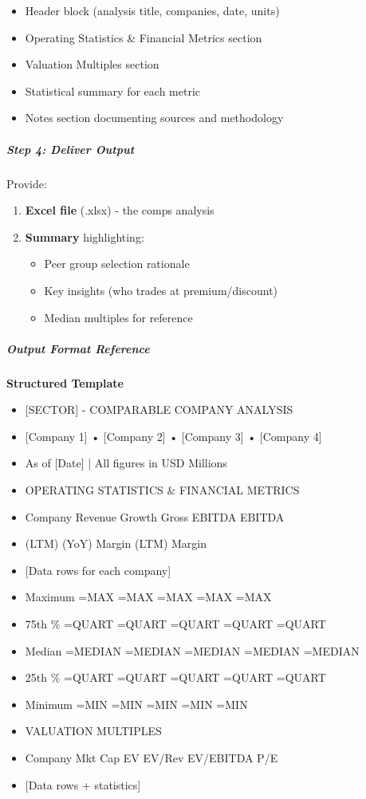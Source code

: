 \documentclass[11pt]{article}
\begin{document}
\begin{itemize}[leftmargin=*,itemsep=2pt,topsep=2pt]
\item {} Header block (analysis title, companies, date, units)
\item {} Operating Statistics \& Financial Metrics section
\item {} Valuation Multiples section
\item {} Statistical summary for each metric
\item {} Notes section documenting sources and methodology
\end{itemize}

\subparagraph{Step 4: Deliver Output}\mbox{}\par

Provide:

\begin{enumerate}[leftmargin=*,itemsep=2pt,topsep=2pt]
\item {} \textbf{Excel file} (.xlsx) - the comps analysis
\item {} \textbf{Summary} highlighting:
\begin{itemize}[leftmargin=*,itemsep=2pt,topsep=2pt]
\item {} Peer group selection rationale
\item {} Key insights (who trades at premium/discount)
\item {} Median multiples for reference
\end{itemize}
\end{enumerate}

\subparagraph{Output Format Reference}\mbox{}\par

\textbf{Structured Template}
\begin{itemize}[leftmargin=*,itemsep=2pt,topsep=2pt]
\item {} [SECTOR] - COMPARABLE COMPANY ANALYSIS
\item {} [Company 1] • [Company 2] • [Company 3] • [Company 4]
\item {} As of [Date] | All figures in USD Millions
\item {} OPERATING STATISTICS \& FINANCIAL METRICS
\item {} Company Revenue Growth Gross EBITDA EBITDA
\item {} (LTM) (YoY) Margin (LTM) Margin
\item {} [Data rows for each company]
\item {} Maximum =MAX =MAX =MAX =MAX =MAX
\item {} 75th \% =QUART =QUART =QUART =QUART =QUART
\item {} Median =MEDIAN =MEDIAN =MEDIAN =MEDIAN =MEDIAN
\item {} 25th \% =QUART =QUART =QUART =QUART =QUART
\item {} Minimum =MIN =MIN =MIN =MIN =MIN
\item {} VALUATION MULTIPLES
\item {} Company Mkt Cap EV EV/Rev EV/EBITDA P/E
\item {} [Data rows + statistics]
\end{itemize}
\end{document}
